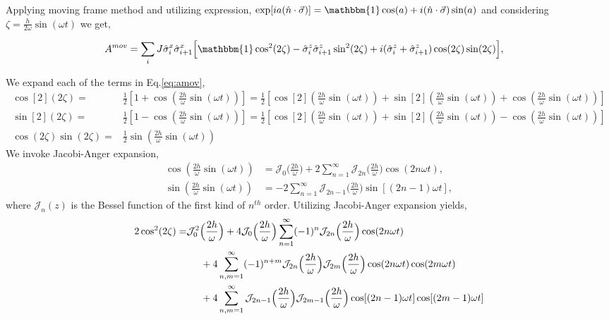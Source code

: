 \documentclass[aps,prb,reprint,showpacs,floatfix,superscriptaddress, onecolumn, nofootinbib, 9pt]{revtex4-2}
\begin{document}
\begin{enumerate}
{		Applying moving frame method and utilizing  expression, $\displaystyle \exp[ia(\hat{n}\cdot\vec{\sigma})] = \mathbbm{1} \cos(a) + i (\hat{n}\cdot\vec{\sigma})\sin(a)$ and considering $\zeta = \frac{h}{2\omega}\sin(\omega t)$ we get,

	\begin{align}
		A^{mov} &= \sum_{i} J \hat{\sigma}_{i}^{x} \hat{\sigma}_{i+1}^{x}  \Big[\mathbbm{1}\cos^2(2\zeta) -\hat{\sigma}^z_i\hat{\sigma}^z_{i+1} \sin^2(2\zeta) + i (\hat{\sigma}^z_i +\hat{\sigma}^z_{i+1})\cos(2\zeta)\sin(2\zeta)\Big],
		\label{eq:amov}
	\end{align}
	
	We expand each of the terms in Eq.\eqref{eq:amov},
	\begin{align}
	\cos[2](2\zeta) =& \frac12\left[1+ \cos(\frac{2h}{\omega}\sin(\omega t))\right]=\frac12\left[\cos[2](\frac{2h}{\omega}\sin(\omega t))+\sin[2](\frac{2h}{\omega}\sin(\omega t)) +\cos(\frac{2h}{\omega}\sin(\omega t))\right]\\
	\sin[2](2\zeta) =& \frac12\left[1- \cos(\frac{2h}{\omega}\sin(\omega t))\right]=\frac12\left[\cos[2](\frac{2h}{\omega}\sin(\omega t))+\sin[2](\frac{2h}{\omega}\sin(\omega t)) -\cos(\frac{2h}{\omega}\sin(\omega t))\right]\\
	\cos(2\zeta)\sin(2\zeta) =& \frac12 \sin(\frac{2h}{\omega}\sin(\omega t))
	\end{align}
	We invoke Jacobi-Anger expansion,
	\begin{align*}
	\cos(\frac{2h}{\omega}\sin(\omega t)) &= \mathcal{J}_0\Big(\frac{2h}{\omega}\Big) + 2 \sum_{n=1}^\infty \mathcal{J}_{2n}\Big(\frac{2h}{\omega}\Big)\cos(2n\omega t),\\
	\sin(\frac{2h}{\omega}\sin(\omega t)) &=-2 \sum_{n=1}^\infty \mathcal{J}_{2n-1}\Big(\frac{2h}{\omega}\Big)\sin[(2n-1)\omega t],
	\end{align*}
	where $\mathcal{J}_n(z)$ is the Bessel function of the first kind of $n^{th}$ order. Utilizing Jacobi-Anger expansion yields,
	\begin{align}
	2\cos[2](2\zeta)=& \mathcal{J}^2_0\Big(\frac{2h}{\omega}\Big) + 4\mathcal{J}_0\Big(\frac{2h}{\omega}\Big)\sum_{n=1}^\infty (-1)^n \mathcal{J}_{2n}\Big(\frac{2h}{\omega}\Big)\cos(2n\omega t)\nonumber\\
	&\hspace{0.5cm}+4\sum_{n,m=1}^\infty(-1)^{n+m}\mathcal{J}_{2n}\Big(\frac{2h}{\omega}\Big)\mathcal{J}_{2m}\Big(\frac{2h}{\omega}\Big) \cos(2n\omega t)\cos(2m\omega t)\nonumber\\
	&\hspace{0.5cm}+4 \sum_{n,m=1}^\infty \mathcal{J}_{2n-1}\Big(\frac{2h}{\omega}\Big)\mathcal{J}_{2m-1}\Big(\frac{2h}{\omega}\Big)\cos[(2n-1)\omega t]\cos[(2m-1)\omega t]\nonumber\\

\end{align}}
\end{enumerate}
\end{document}
